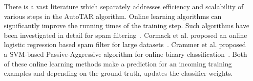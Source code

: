 There is a vast literature which separately addresses efficiency and scalability
of various steps in the AutoTAR algorithm. Online learning algorithms can
significantly improve the running times of the training step. Such algorithms
have been investigated in detail for spam
filtering~\cite{sculley2007relaxed,cormack2007online,sculley2007online}. Cormack
et al.  proposed an online logistic regression based spam filter for large
datasets~\cite{cormack2011efficient}. Crammer et al. proposed a SVM-based
Passive-Aggressive algorithm for online binary
classification~\cite{crammer2006online}. Both of these online learning methods
make a prediction for an incoming training examples and depending on the ground
truth, updates the classifier weights.
